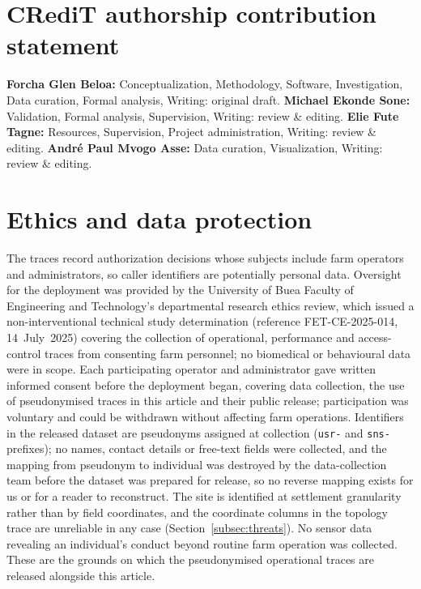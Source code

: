 \documentclass[a4paper,fleqn]{cas-dc}
\begin{document}
\section*{CRediT authorship contribution statement}

\textbf{Forcha Glen Beloa:} Conceptualization, Methodology, Software,
Investigation, Data curation, Formal analysis, Writing: original draft.
\textbf{Michael Ekonde Sone:} Validation, Formal analysis, Supervision,
Writing: review \& editing. \textbf{Elie Fute Tagne:} Resources,
Supervision, Project administration, Writing: review \& editing.
\textbf{Andr\'{e} Paul Mvogo Asse:} Data curation, Visualization,
Writing: review \& editing.

\section*{Ethics and data protection}

The traces record authorization decisions whose subjects include farm
operators and administrators, so caller identifiers are potentially personal
data. Oversight for the deployment was provided by the University of Buea
Faculty of Engineering and Technology's departmental research ethics review,
which issued a non-interventional technical study determination
(reference FET-CE-2025-014, 14~July~2025) covering the collection of
operational, performance and access-control traces from consenting farm
personnel; no biomedical or behavioural data were in scope. Each
participating operator and administrator gave written informed consent before
the deployment began,
covering data collection, the use of pseudonymised traces in this article and
their public release; participation was voluntary and could be withdrawn
without affecting farm operations. Identifiers in the released dataset are
pseudonyms assigned at collection (\texttt{usr-} and \texttt{sns-} prefixes);
no names, contact details or free-text fields were collected, and the
mapping from pseudonym to individual was destroyed by the data-collection
team before the dataset was prepared for release, so no reverse mapping
exists for us or for a reader to reconstruct. The site is identified at
settlement granularity rather than by field coordinates, and the coordinate
columns in the topology trace are unreliable in any case
(Section~\ref{subsec:threats}). No sensor data revealing an individual's
conduct beyond routine farm operation was collected. These are the grounds
on which the pseudonymised operational traces are released alongside this
article.
\end{document}

